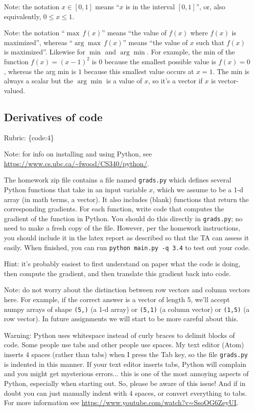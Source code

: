 \documentclass{article}
\def\rubric#1{\gre{Rubric: \{#1\}}}{}
\def\blu#1{{\color{blu}#1}}
\def\gre#1{{\color{gre}#1}}
\begin{document}
Note: the notation $x\in [0,1]$ means ``$x$ is in the interval $[0,1]$'', or, also equivalently, $0 \leq x \leq 1$.

Note: the notation ``$\max \, f(x)$'' means ``the value of $f(x)$ where $f(x)$ is maximized'', whereas ``$\arg \max \, f(x)$'' means ``the value of $x$ such that $f(x)$ is maximized''.
Likewise for $\min$ and $\arg \min$. For example, the min of the function $f(x)=(x-1)^2$ is $0$ because the smallest possible value is $f(x)=0$, 
whereas the arg min is $1$ because this smallest value occurs at $x=1$. The min is always a scalar but the $\arg \min$ is a value of $x$, so it's a vector 
if $x$ is vector-valued.

\subsection{Derivatives of code}

\rubric{code:4}

Note: for info on installing and using Python, see \\\url{https://www.cs.ubc.ca/~fwood/CS340/python/}.

The homework zip file contains a file named \texttt{grads.py} which defines several Python functions that take in an input variable $x$, which we assume to be a 1-d array (in math terms, a vector).
It also includes (blank) functions that return the corresponding gradients.
For each function, \blu{write code that computes the gradient of the function} in Python.
You should do this directly in \texttt{grads.py}; no need to make a fresh copy of the file. However, per the homework instructions, you should include it in the latex report as described so that the TA can assess it easily. When finished, you can run \texttt{python main.py -q 3.4} to test out your code. 

Hint: it's probably easiest to first understand on paper what the code is doing, then compute
the gradient, and then translate this gradient back into code.

Note: do not worry about the distinction between row vectors and column vectors here.
For example, if the correct answer is a vector of length 5, we'll accept numpy arrays
of shape \texttt{(5,)} (a 1-d array) or \texttt{(5,1)} (a column vector) or
\texttt{(1,5)} (a row vector). In future assignments we will start to be more careful
about this.

Warning: Python uses whitespace instead of curly braces to delimit blocks of code.
Some people use tabs and other people use spaces. My text editor (Atom) inserts 4 spaces (rather than tabs) when
I press the Tab key, so the file \texttt{grads.py} is indented in this manner. If your text editor inserts tabs,
Python will complain and you might get mysterious errors... this is one of the most annoying aspects
of Python, especially when starting out. So, please be aware of this issue! And if in doubt you can just manually
indent with 4 spaces, or convert everything to tabs. For more information
see \url{https://www.youtube.com/watch?v=SsoOG6ZeyUI}.
\end{document}
